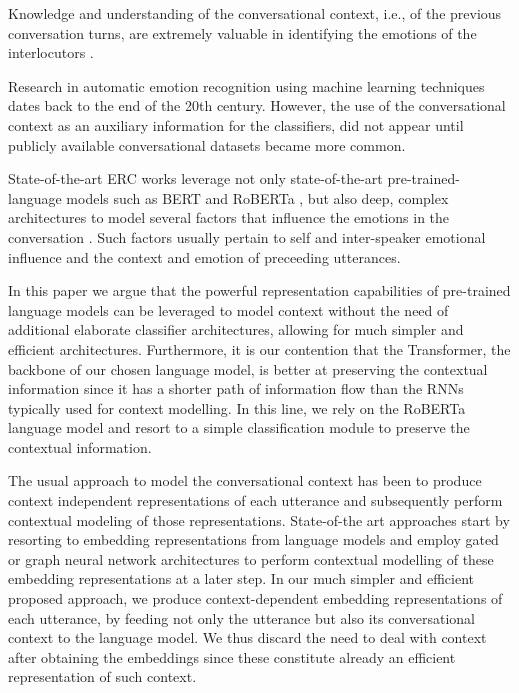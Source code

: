 \documentclass[11pt]{article}
\begin{document}
Knowledge and understanding of the conversational context, i.e., of the previous conversation turns, are extremely valuable in identifying the emotions of the interlocutors \cite{poria2019emotion} \cite{chatterjee2019semeval} \cite{pereira2022deep}.

Research in automatic emotion recognition using machine learning techniques dates back to the end of the 20th century. 
However, the use of the conversational context as an auxiliary information for the classifiers, did not appear until publicly available conversational datasets became more common.

State-of-the-art ERC works leverage not only state-of-the-art pre-trained-language models such as BERT \cite{devlin2018bert} and RoBERTa \cite{liu2019roberta}, but also deep, complex architectures to model several factors that influence the emotions in the conversation \cite{pereira2022deep}. Such factors usually pertain to self and inter-speaker emotional influence and the context and emotion of preceeding utterances.

In this paper we argue that the powerful representation capabilities of pre-trained language models can be leveraged to model context without the need of additional elaborate classifier architectures, allowing for much simpler and efficient architectures. Furthermore, it is our contention that the Transformer, the backbone of our chosen language model, is better at preserving the contextual information since it has a shorter path of information flow than the RNNs typically used for context modelling. In this line, we rely on the RoBERTa language model and resort to a simple classification module to preserve the contextual information. 

The usual approach to model the conversational context has been to produce context independent representations of each utterance and subsequently perform contextual modeling of those representations. State-of-the art approaches start by resorting to embedding representations from language models and employ gated or graph neural network architectures to perform contextual modelling of these embedding representations at a later step. In our much simpler and efficient proposed approach, we produce context-dependent embedding representations of each utterance, by feeding not only the utterance but also its conversational context to the language model. We thus discard the need to deal with context after obtaining the embeddings since these constitute already an efficient representation of such context. 
\end{document}

